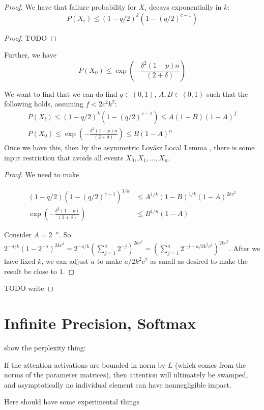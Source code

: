 \documentclass[11pt,a4paper]{article}
\begin{document}
\begin{proof}
We have that failure probability for $X_i$ decays exponentially in $k$:
\begin{equation}
P(X_i) \leq (1-q/2)^{k} (1-(q/2)^{c-1})
\end{equation}
\begin{proof}
TODO
\end{proof}

Further, we have
\begin{equation}
P(X_0) \leq    \exp\left(-\frac{\delta^2(1-p)n}{(2+\delta)}\right)
\end{equation}

We want to find that we can do find $q \in (0,1)$, $A, B \in (0,1)$ such that the following holds, assuming $f < 2c^2k^2$:
\begin{align}
 P(X_i) \leq   (1-q/2)^{k} (1-(q/2)^{c-1}) \leq A(1-B)(1-A)^f \\
P(X_0) \leq \exp\left(-\frac{\delta^2(1-p)n}{(2+\delta)}\right)  \leq B (1-A)^n
\end{align}
Once we have this, then by the asymmetric Lov{\'a}sz Local Lemma \cite{mitzenmacherprobability}, there is some input restriction that avoids all events $X_0, X_1, ..., X_n$.

\begin{proof}
We need to make

\begin{align}
    (1-q/2) (1-(q/2)^{c-1})^{1/k} &\leq A^{1/k}(1-B)^{1/k}(1-A)^{2kc^2} \\
\exp\left(-\frac{\delta^2(1-p)}{(2+\delta)}\right)  &\leq B^{1/n} (1-A)
\end{align}

Consider $A=2^{-a}$.
So $2^{-a/k} (1-2^{-a})^{2kc^2} = 2^{-a/k} (\sum_{j=1}^a 2^{-j})^{2kc^2} = (\sum_{j=1}^a 2^{-j-a/{2k^2c^2}})^{2kc^2}$. After we have fixed $k$, we can adjust $a$ to make $a/{2k^2c^2}$ as small as desired to make the result be close to $1$.
\end{proof}
TODO write

\end{proof}

\section{Infinite Precision, Softmax}

show the perplexity thing:

If the attention activations are bounded in norm by $L$ (which comes from the norms of the parameter matrices), then attention will ultimately be swamped, and asymptotically no individual element can have nonnegligible impact.

Here should have some experimental things
\end{document}
